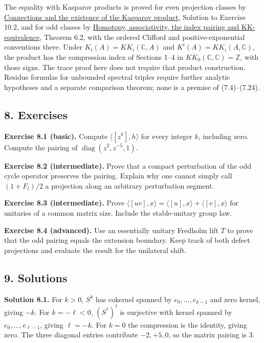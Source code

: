 \documentclass[
  11pt,
]{article}
\begin{document}
The equality with Kasparov products is proved for even projection
classes by \href{KT-KK-09.html}{Connections and the existence of the
Kasparov product}, Solution to Exercise 10.2, and for odd classes by
\href{KT-KK-10.html}{Homotopy, associativity, the index pairing and
KK-equivalence}, Theorem 6.2, with the ordered Clifford and
positive-exponential conventions there. Under
\(K_i(A)=KK_i(\mathbb C,A)\) and \(K^i(A)=KK_i(A,\mathbb C)\), the
product has the compression index of Sections 1--4 in
\(KK_0(\mathbb C,\mathbb C)=\mathbb Z\), with those signs. The trace
proof here does not require that product construction. Residue formulas
for unbounded spectral triples require further analytic hypotheses and a
separate comparison theorem; none is a premise of (7.4)--(7.24).

\subsection{8. Exercises}\label{exercises}

\textbf{Exercise 8.1 (basic).} Compute \(\langle[z^k],h\rangle\) for
every integer \(k\), including zero. Compute the pairing of
\(\operatorname{diag}(z^2,z^{-5},1)\).

\textbf{Exercise 8.2 (intermediate).} Prove that a compact perturbation
of the odd cycle operator preserves the pairing. Explain why one cannot
simply call \((1+F_t)/2\) a projection along an arbitrary perturbation
segment.

\textbf{Exercise 8.3 (intermediate).} Prove
\(\langle[uv],x\rangle=\langle[u],x\rangle+\langle[v],x\rangle\) for
unitaries of a common matrix size. Include the stable-unitary group law.

\textbf{Exercise 8.4 (advanced).} Use an essentially unitary Fredholm
lift \(T\) to prove that the odd pairing equals the extension boundary.
Keep track of both defect projections and evaluate the result for the
unilateral shift.

\subsection{9. Solutions}\label{solutions}

\textbf{Solution 8.1.} For \(k>0\), \(S^k\) has cokernel spanned by
\(e_0,\ldots,e_{k-1}\) and zero kernel, giving \(-k\). For
\(k=-\ell<0\), \((S^*)^\ell\) is surjective with kernel spanned by
\(e_0,\ldots,e_{\ell-1}\), giving \(\ell=-k\). For \(k=0\) the
compression is the identity, giving zero. The three diagonal entries
contribute \(-2,+5,0\), so the matrix pairing is \(3\).
\end{document}
